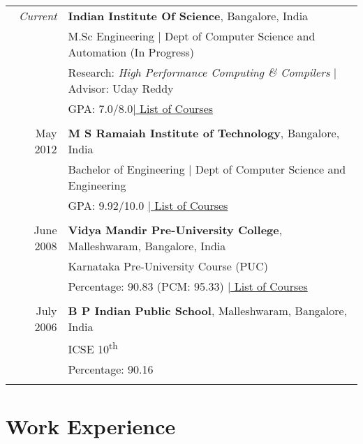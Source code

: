 \documentclass[a4paper,10pt]{article} %
\begin{document}
\begin{tabular}{rp{13cm}}
\emph{Current} & \textbf{Indian Institute Of Science}, Bangalore, India\\
& M.Sc Engineering | Dept of Computer Science and Automation (In Progress)\\
& Research: \small\emph{High Performance Computing \& Compilers} | Advisor: Uday Reddy\\
&\normalsize GPA: 7.0/8.0\hyperlink{iisc}{\hfill | \footnotesize List of Courses}\\
&\\


May 2012 & \textbf{M S Ramaiah Institute of Technology}, Bangalore, India\\
& Bachelor of Engineering | Dept of Computer Science and Engineering \\
&\normalsize GPA: 9.92/10.0 \hyperlink{msrit}{\hfill| \footnotesize List of Courses}\\
&\\


June 2008 & \textbf{Vidya Mandir Pre-University College}, Malleshwaram, Bangalore, India\\
& Karnataka Pre-University Course (PUC) \\
&\normalsize Percentage: 90.83 (PCM: 95.33) \hyperlink{hs}{\hfill| \footnotesize List of Courses}\\
&\\


July 2006 & \textbf{B P Indian Public School}, Malleshwaram, Bangalore, India\\
& ICSE 10\textsuperscript{th} \\
&\normalsize Percentage: 90.16 \\
&\\
\end{tabular}


\section{Work Experience}
\end{document}
